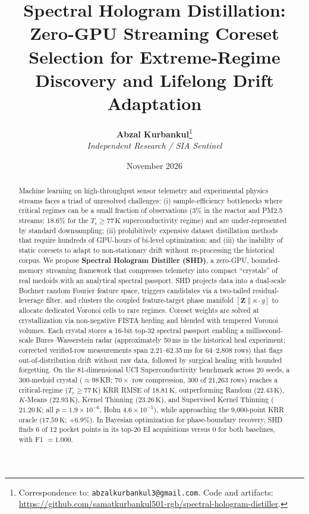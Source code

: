 \documentclass[11pt,a4paper]{article}
\title{\textbf{Spectral Hologram Distillation: Zero-GPU Streaming Coreset Selection for Extreme-Regime Discovery and Lifelong Drift Adaptation}}
\author{
  \textbf{Abzal Kurbankul}\thanks{Correspondence to: \texttt{abzalkurbankul3@gmail.com}. Code and artifacts: \url{https://github.com/samatkurbankul501-rgb/spectral-hologram-distiller}.} \\
  \textit{Independent Research / SIA Sentinel}
}
\date{November 2026}
\begin{document}
\maketitle

\begin{abstract}
Machine learning on high-throughput sensor telemetry and experimental physics streams faces a triad of unresolved challenges: (i) sample-efficiency bottlenecks where critical regimes can be a small fraction of observations (3\% in the reactor and PM2.5 streams; 18.6\% for the $T_c \ge 77\,\mathrm{K}$ superconductivity regime) and are under-represented by standard downsampling; (ii) prohibitively expensive dataset distillation methods that require hundreds of GPU-hours of bi-level optimization; and (iii) the inability of static coresets to adapt to non-stationary drift without re-processing the historical corpus. We propose \textbf{Spectral Hologram Distiller (SHD)}, a zero-GPU, bounded-memory streaming framework that compresses telemetry into compact ``crystals'' of real medoids with an analytical spectral passport. SHD projects data into a dual-scale Bochner random Fourier feature space, triggers candidates via a two-tailed residual-leverage filter, and clusters the coupled feature-target phase manifold $[\mathbf{Z} \parallel \kappa \cdot y]$ to allocate dedicated Voronoi cells to rare regimes. Coreset weights are solved at crystallization via non-negative FISTA herding and blended with tempered Voronoi volumes. Each crystal stores a 16-bit top-32 spectral passport enabling a millisecond-scale Bures--Wasserstein radar (approximately 50\,ms in the historical heal experiment; corrected verified-row measurements span 2.21--62.35\,ms for 64--2{,}808 rows) that flags out-of-distribution drift without raw data, followed by surgical healing with bounded forgetting. On the 81-dimensional UCI Superconductivity benchmark across 20 seeds, a 300-medoid crystal ($\approx 98$\,KB; $70\times$ row compression, 300 of 21{,}263 rows) reaches a critical-regime ($T_c \ge 77\,\mathrm{K}$) KRR RMSE of $18.81\,\mathrm{K}$, outperforming Random ($22.43\,\mathrm{K}$), $K$-Means ($22.93\,\mathrm{K}$), Kernel Thinning ($23.26\,\mathrm{K}$), and Supervised Kernel Thinning ($21.20\,\mathrm{K}$; all $p = 1.9 \times 10^{-6}$, Holm $4.6 \times 10^{-5}$), while approaching the 9,000-point KRR oracle ($17.59\,\mathrm{K}$; $+6.9\%$). In Bayesian optimization for phase-boundary recovery, SHD finds 6 of 12 pocket points in its top-20 EI acquisitions versus 0 for both baselines, with F1 $= 1.000$.
\end{abstract}
\end{document}
